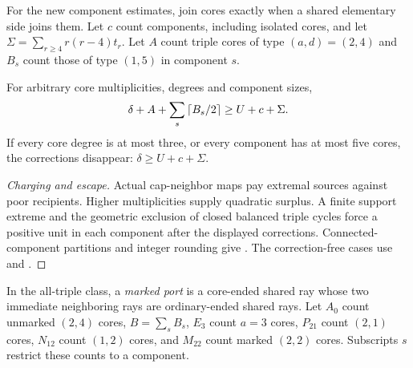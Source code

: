 For the new component estimates, join cores exactly when a shared elementary side joins them. Let $c$ count components, including isolated cores, and let $\Sigma=\sum_{r\ge4}r(r-4)t_r$. Let $A$ count triple cores of type $(a,d)=(2,4)$ and $B_s$ count those of type $(1,5)$ in component $s$.

\begin{theorem}\label{jup:mixed}
For arbitrary core multiplicities, degrees and component sizes,
\begin{equation}\label{jup:mixed-formula}
 \delta+A+\sum_s\left\lceil B_s/2\right\rceil\ge U+c+\Sigma.
\end{equation}
If every core degree is at most three, or every component has at most five cores, the corrections disappear: $\delta\ge U+c+\Sigma$.
\end{theorem}
\begin{proof}[Charging and escape]
Actual cap-neighbor maps pay extremal sources against poor recipients. Higher multiplicities supply quadratic surplus. A finite support extreme and the geometric exclusion of closed balanced triple cycles force a positive unit in each component after the displayed corrections. Connected-component partitions and integer rounding give
.
The correction-free cases use
 and
.
\end{proof}

In the all-triple class, a \emph{marked port} is a core-ended shared ray whose two immediate neighboring rays are ordinary-ended shared rays. Let $A_0$ count unmarked $(2,4)$ cores, $B=\sum_s B_s$, $E_3$ count $a=3$ cores, $P_{21}$ count $(2,1)$ cores, $N_{12}$ count $(1,2)$ cores, and $M_{22}$ count marked $(2,2)$ cores. Subscripts $s$ restrict these counts to a component.

